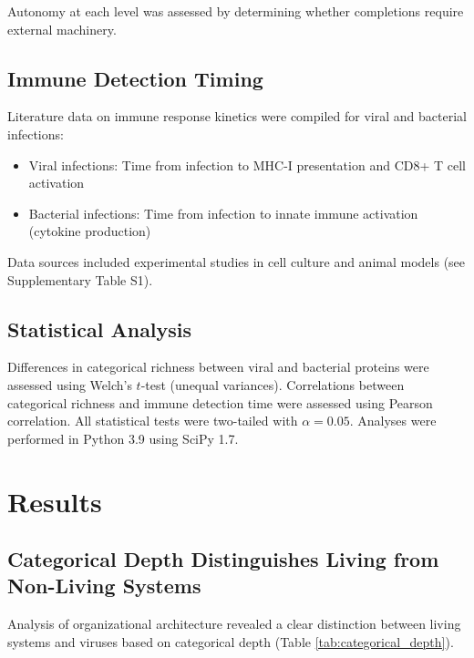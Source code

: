\documentclass[11pt]{article}
\begin{document}
Autonomy at each level was assessed by determining whether completions require external machinery.

\subsection{Immune Detection Timing}

Literature data on immune response kinetics were compiled for viral and bacterial infections:

\begin{itemize}
\item Viral infections: Time from infection to MHC-I presentation and CD8+ T cell activation
\item Bacterial infections: Time from infection to innate immune activation (cytokine production)
\end{itemize}

Data sources included experimental studies in cell culture and animal models (see Supplementary Table S1).

\subsection{Statistical Analysis}

Differences in categorical richness between viral and bacterial proteins were assessed using Welch's $t$-test (unequal variances). Correlations between categorical richness and immune detection time were assessed using Pearson correlation. All statistical tests were two-tailed with $\alpha = 0.05$. Analyses were performed in Python 3.9 using SciPy 1.7.

\section{Results}

\subsection{Categorical Depth Distinguishes Living from Non-Living Systems}

Analysis of organizational architecture revealed a clear distinction between living systems and viruses based on categorical depth (Table \ref{tab:categorical_depth}).
\end{document}
